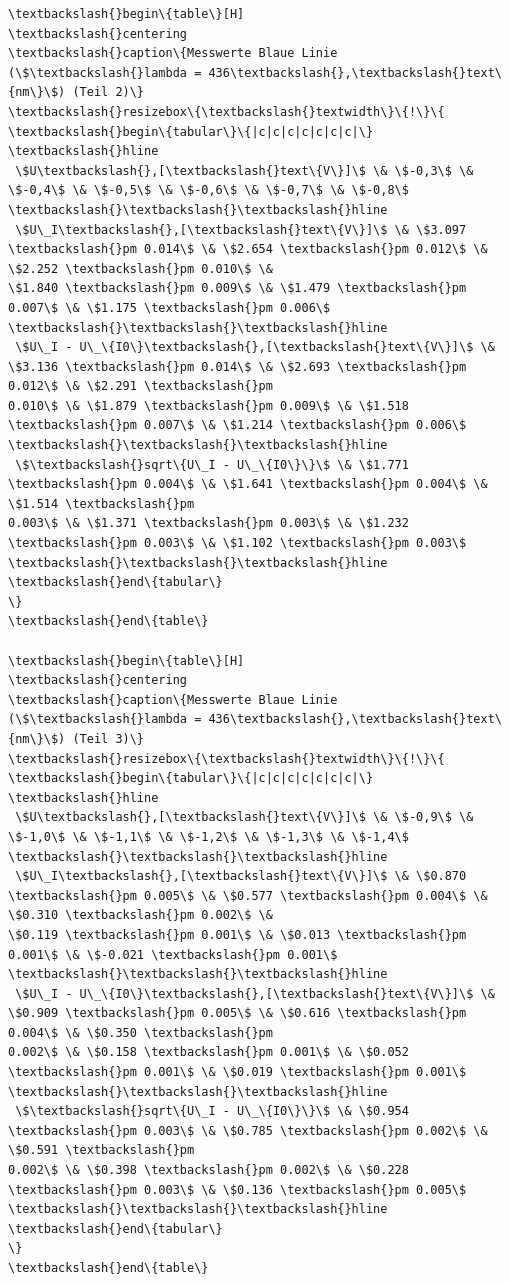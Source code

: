 \begin{Verbatim}[commandchars=\\\{\}]
\textbackslash{}begin\{table\}[H]
\textbackslash{}centering
\textbackslash{}caption\{Messwerte Blaue Linie (\$\textbackslash{}lambda = 436\textbackslash{},\textbackslash{}text\{nm\}\$) (Teil 2)\}
\textbackslash{}resizebox\{\textbackslash{}textwidth\}\{!\}\{
\textbackslash{}begin\{tabular\}\{|c|c|c|c|c|c|c|\}
\textbackslash{}hline
 \$U\textbackslash{},[\textbackslash{}text\{V\}]\$ \& \$-0,3\$ \& \$-0,4\$ \& \$-0,5\$ \& \$-0,6\$ \& \$-0,7\$ \& \$-0,8\$ \textbackslash{}\textbackslash{}\textbackslash{}hline
 \$U\_I\textbackslash{},[\textbackslash{}text\{V\}]\$ \& \$3.097 \textbackslash{}pm 0.014\$ \& \$2.654 \textbackslash{}pm 0.012\$ \& \$2.252 \textbackslash{}pm 0.010\$ \&
\$1.840 \textbackslash{}pm 0.009\$ \& \$1.479 \textbackslash{}pm 0.007\$ \& \$1.175 \textbackslash{}pm 0.006\$ \textbackslash{}\textbackslash{}\textbackslash{}hline
 \$U\_I - U\_\{I0\}\textbackslash{},[\textbackslash{}text\{V\}]\$ \& \$3.136 \textbackslash{}pm 0.014\$ \& \$2.693 \textbackslash{}pm 0.012\$ \& \$2.291 \textbackslash{}pm
0.010\$ \& \$1.879 \textbackslash{}pm 0.009\$ \& \$1.518 \textbackslash{}pm 0.007\$ \& \$1.214 \textbackslash{}pm 0.006\$ \textbackslash{}\textbackslash{}\textbackslash{}hline
 \$\textbackslash{}sqrt\{U\_I - U\_\{I0\}\}\$ \& \$1.771 \textbackslash{}pm 0.004\$ \& \$1.641 \textbackslash{}pm 0.004\$ \& \$1.514 \textbackslash{}pm
0.003\$ \& \$1.371 \textbackslash{}pm 0.003\$ \& \$1.232 \textbackslash{}pm 0.003\$ \& \$1.102 \textbackslash{}pm 0.003\$ \textbackslash{}\textbackslash{}\textbackslash{}hline
\textbackslash{}end\{tabular\}
\}
\textbackslash{}end\{table\}

\textbackslash{}begin\{table\}[H]
\textbackslash{}centering
\textbackslash{}caption\{Messwerte Blaue Linie (\$\textbackslash{}lambda = 436\textbackslash{},\textbackslash{}text\{nm\}\$) (Teil 3)\}
\textbackslash{}resizebox\{\textbackslash{}textwidth\}\{!\}\{
\textbackslash{}begin\{tabular\}\{|c|c|c|c|c|c|c|\}
\textbackslash{}hline
 \$U\textbackslash{},[\textbackslash{}text\{V\}]\$ \& \$-0,9\$ \& \$-1,0\$ \& \$-1,1\$ \& \$-1,2\$ \& \$-1,3\$ \& \$-1,4\$ \textbackslash{}\textbackslash{}\textbackslash{}hline
 \$U\_I\textbackslash{},[\textbackslash{}text\{V\}]\$ \& \$0.870 \textbackslash{}pm 0.005\$ \& \$0.577 \textbackslash{}pm 0.004\$ \& \$0.310 \textbackslash{}pm 0.002\$ \&
\$0.119 \textbackslash{}pm 0.001\$ \& \$0.013 \textbackslash{}pm 0.001\$ \& \$-0.021 \textbackslash{}pm 0.001\$ \textbackslash{}\textbackslash{}\textbackslash{}hline
 \$U\_I - U\_\{I0\}\textbackslash{},[\textbackslash{}text\{V\}]\$ \& \$0.909 \textbackslash{}pm 0.005\$ \& \$0.616 \textbackslash{}pm 0.004\$ \& \$0.350 \textbackslash{}pm
0.002\$ \& \$0.158 \textbackslash{}pm 0.001\$ \& \$0.052 \textbackslash{}pm 0.001\$ \& \$0.019 \textbackslash{}pm 0.001\$ \textbackslash{}\textbackslash{}\textbackslash{}hline
 \$\textbackslash{}sqrt\{U\_I - U\_\{I0\}\}\$ \& \$0.954 \textbackslash{}pm 0.003\$ \& \$0.785 \textbackslash{}pm 0.002\$ \& \$0.591 \textbackslash{}pm
0.002\$ \& \$0.398 \textbackslash{}pm 0.002\$ \& \$0.228 \textbackslash{}pm 0.003\$ \& \$0.136 \textbackslash{}pm 0.005\$ \textbackslash{}\textbackslash{}\textbackslash{}hline
\textbackslash{}end\{tabular\}
\}
\textbackslash{}end\{table\}



\end{Verbatim}

